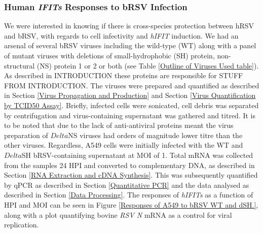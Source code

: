 \subsubsection{Human \textit{IFITs} Responses to bRSV Infection} \label{Human IFITs Responses to bRSV}
We were interested in knowing if there is cross-species protection between hRSV and bRSV, with regards to cell infectivity and \textit{hIFIT} induction. We had an arsenal of several bRSV viruses including the wild-type (WT) along with a panel of mutant viruses with deletions of small-hydrophobic (SH) protein, non-structural (NS) protein 1 or 2 or both (see Table \ref{Outline of Viruses Used table}). As described in INTRODUCTION these proteins are responsible for STUFF FROM INTRODUCTION. The viruses were prepared and quantified as described in Section \ref{Virus Propagation and Production} and Section \ref{Virus Quantification by TCID50 Assay}. Briefly, infected cells were sonicated, cell debris was separated by centrifugation and virus-containing supernatant was gathered and titred. It is to be noted that due to the lack of anti-antiviral proteins meant the virus preparation of \(Delta\)NS viruses had orders of magnitude lower titre than the other viruses. Regardless, A549 cells were initially infected with the WT and \(Delta\)SH bRSV-containing supernatant at MOI of 1. Total mRNA was collected from the samples 24 HPI and converted to complementary DNA, as described in Section \ref{RNA Extraction and cDNA Synthesis}. This was subsequently quantified by qPCR as described in Section \ref{Quantitative PCR} and the data analysed as described in Section \ref{Data Processing}. The responses of \textit{hIFITs} as a function of HPI and MOI can be seen in Figure \ref{Responses of A549 to bRSV WT and dSH.}, along with a plot quantifying bovine \textit{RSV N} mRNA as a control for viral replication.

